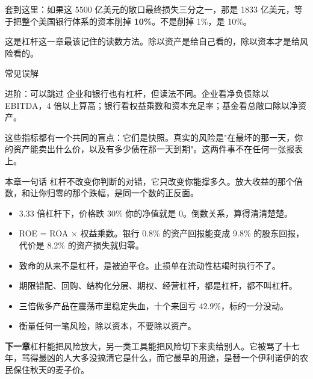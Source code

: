 套到这里：如果这 5500 亿美元的敞口最终损失三分之一，那是 1833 亿美元，等于把整个美国银行体系的资本削掉 \textbf{10\%}。不是削掉 1\%，是 10\%。

这是杠杆这一章最该记住的读数方法。除以资产是给自己看的，除以资本才是给风险看的。

\begin{mythbox}{常见误解}
\end{mythbox}

\begin{deepbox}{进阶：可以跳过}
企业和银行也有杠杆，但读法不同。企业看净负债除以 EBITDA，4 倍以上算高；银行看权益乘数和资本充足率；基金看总敞口除以净资产。

这些指标都有一个共同的盲点：它们是快照。真实的风险是"在最坏的那一天，你的资产能卖出什么价，以及有多少债在那一天到期"。这两件事不在任何一张报表上。

\end{deepbox}

\begin{takeaway}{本章一句话}
杠杆不改变你判断的对错，它只改变你能撑多久。放大收益的那个倍数，和让你归零的那个跌幅，是同一个数的正反面。

\begin{itemize}
  \item 3.33 倍杠杆下，价格跌 30\% 你的净值就是 0。倒数关系，算得清清楚楚。
  \item ROE = ROA × 权益乘数。银行 0.8\% 的资产回报能变成 9.8\% 的股东回报，代价是 8.2\% 的资产损失就归零。
  \item 致命的从来不是杠杆，是被迫平仓。止损单在流动性枯竭时执行不了。
  \item 期限错配、回购、结构化分层、期权、经营杠杆，都是杠杆，都不叫杠杆。
  \item 三倍做多产品在震荡市里稳定失血，十个来回亏 42.9\%，标的一分没动。
  \item 衡量任何一笔风险，除以资本，不要除以资产。
\end{itemize}

\end{takeaway}

\begin{bridgebox}
\textbf{下一章}杠杆能把风险放大，另一类工具能把风险切下来卖给别人。它被骂了十七年，骂得最凶的人大多没搞清它是什么，而它最早的用途，是替一个伊利诺伊的农民保住秋天的麦子价。
\end{bridgebox}

